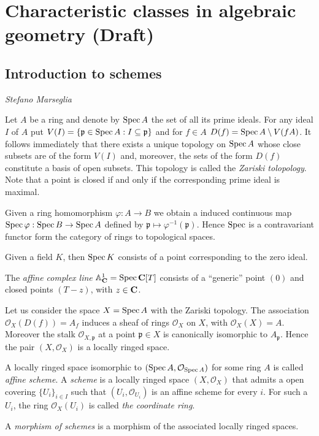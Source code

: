 \documentclass[a4paper,openany]{scrbook}
\newcommand{\chapterauthor}[1]{\hfill\emph{#1}\par\noindent}
\begin{document}
\chapter{Characteristic classes in algebraic geometry (Draft)}
\section{Introduction to schemes}
\chapterauthor{Stefano Marseglia}

Let $A$ be a ring and denote by $\operatorname{Spec} A$ the set of all its prime ideals. For any ideal $I$ of $A$ put
$V(I)=\{\mathfrak p \in \operatorname{Spec} A : I \subseteq \mathfrak p\}$
and for $f\in A$
$D(f)= \operatorname{Spec} A\setminus V(fA)$.
It follows immediately that there exists a unique topology on $\operatorname{Spec} A$ whose close subsets are of the form $V(I)$ and, moreover, the sets of the form $D(f)$ constitute a basis of open subsets. This topology is called the \emph{Zariski tolopology}. Note that a point is closed if and only if the corresponding prime ideal is maximal.

Given a ring homomorphism $\varphi:A\to B$ we obtain a induced continuous map $\operatorname{Spec} \varphi: \operatorname{Spec} B \to \operatorname{Spec} A$ defined by $\mathfrak p \mapsto \varphi^{-1}(\mathfrak p)$. Hence $\operatorname{Spec}$ is a contravariant functor form the category of rings to topological spaces.

\begin{example}
 Given a field $K$, then $\operatorname{Spec} K$ consists of a point corresponding to the zero ideal.

 The \emph{affine complex line} $\mathbb A_\mathbf C^1=\operatorname{Spec} \mathbf C[T]$ consists of a ``generic'' point $(0)$ and closed points $(T-z)$, with $z\in \mathbf C$.
\end{example}
Let us consider the space $X = \operatorname{Spec} A$ with the Zariski topology. The association $\mathcal O_X(D(f))=A_f$ induces a sheaf of rings $\mathcal O_X$ on $X$, with $\mathcal O_X(X)=A$. Moreover the stalk $\mathcal O_{X,\mathfrak p}$ at a point $\mathfrak p\in X$ is canonically isomorphic to $A_\mathfrak p$. Hence the pair $(X,\mathcal O_X)$ is a locally ringed space.
\begin{defn} 
 A locally ringed space isomorphic to $(\operatorname{Spec} A,\mathcal O_{\operatorname{Spec} A})$ for some ring $A$ is called \emph{affine scheme}. A \emph{scheme} is a locally ringed space $(X,\mathcal O_X)$ that admits a open covering $\{U_i\}_{i\in I}$ such that $(U_i,\mathcal O_{U_i})$ is an affine scheme for every $i$. For such a $U_i$, the ring $\mathcal O_X(U_i)$ is called \emph{the coordinate ring}.

 A \emph{morphism of schemes} is a morphism of the associated locally ringed spaces.
\end{defn}
\end{document}
